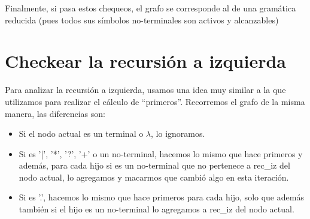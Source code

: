 \documentclass[a4paper]{report}
\begin{document}
%
%
%
%
%
%


	Finalmente, si pasa estos chequeos, el grafo se
corresponde al de una gramática reducida (pues todos sus símbolos no-terminales son
activos y alcanzables)


\section*{Checkear la recursión a izquierda}

	Para analizar la recursión a izquierda, usamos una idea muy similar a la que
utilizamos para realizar el cálculo de ``primeros''. Recorremos el grafo de la misma manera, las
diferencias son:


\begin{itemize}

\item Si el nodo actual es un terminal o $\lambda$, lo ignoramos.

\item Si es '|', '*', '?', '+' o un no-terminal, hacemos lo mismo que hace primeros y además, para cada hijo si es un no-terminal que no pertenece a rec\_iz del nodo actual, lo agregamos y macarmos que cambió algo en
esta iteración.

\item Si es '.', hacemos lo mismo que hace primeros para cada hijo, solo que además también si el hijo es un no-terminal lo agregamos a rec\_iz del
nodo actual.

\end{itemize}
\end{document}
